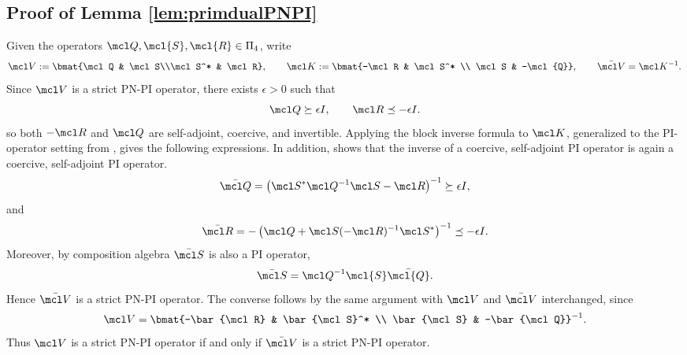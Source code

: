 \subsection{Proof of Lemma \ref{lem:primdualPNPI}}\label{proof:primdualPNPI}
Given the operators $\mcl Q, \mcl{S}, \mcl{R} \in \Pi_4$, write
\begin{equation*}
    \mcl V
    :=
    \bmat{\mcl Q & \mcl S\\\mcl S^* & \mcl R},
    \qquad
    \mcl K:=\bmat{-\mcl R & \mcl S^* \\ \mcl S & -\mcl{Q}},
    \qquad
    \bar{\mcl V}=\mcl K^{-1}.
\end{equation*}
Since \(\mcl V\) is a strict PN-PI operator, there exists \(\epsilon>0\) such that
\begin{equation*}
    \mcl Q\succeq \epsilon I,
    \qquad
    \mcl R\preceq -\epsilon I.
\end{equation*}
so both \(-\mcl R\) and \(\mcl Q\) are self-adjoint, coercive, and invertible.
Applying the block inverse formula to \(\mcl K\), generalized to the PI-operator
setting from \cite{lu2002inverses}, gives the following expressions. In addition,
\cite[Theorem 2]{peet2018convexsolutionhinftyoptimalcontroller} shows that the
inverse of a coercive, self-adjoint PI operator is again a coercive,
self-adjoint PI operator.
\begin{equation*}
    \bar{\mcl Q}
    =
    \left(\mcl S^*\mcl Q^{-1}\mcl S -\mcl R\right)^{-1} \succeq \epsilon I,
\end{equation*}
and
\begin{equation*}
    \bar{\mcl R}
    =
    -\left(\mcl Q+\mcl S(-\mcl R)^{-1}\mcl S^*\right)^{-1}
    \preceq -\epsilon I.
\end{equation*}
Moreover, by composition algebra $\bar{\mcl S}$ is also a PI operator,
\begin{equation*}
    \bar{\mcl S} = {\mcl Q}^{-1} \mcl{S}\bar{\mcl{Q}}.
\end{equation*}
Hence \(\bar{\mcl V}\) is a strict PN-PI operator. The converse follows by the
same argument with \(\mcl V\) and \(\bar{\mcl V}\) interchanged, since
\begin{equation*}
    \mcl V=\bmat{-\bar{\mcl R} & \bar{\mcl S}^* \\ \bar{\mcl S} & -\bar{\mcl Q}}^{-1}.
\end{equation*}
Thus \(\mcl V\) is a strict PN-PI operator if and only if \(\bar{\mcl V}\) is a
strict PN-PI operator.
